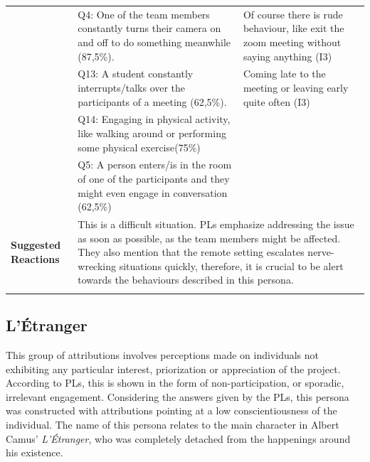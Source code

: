 \begin{longtable}[ht]{ p{}  p{} p{} }
     &  Q4: One of the team members constantly turns their camera on and off to do something meanwhile (87,5\%). & Of course there is rude behaviour, like exit the zoom meeting without saying anything (I3) \\
     & Q13: A student constantly interrupts/talks over the participants of a meeting (62,5\%). &  Coming late to the meeting or leaving early quite often (I3) \\
 	 & Q14: Engaging in physical activity, like walking around or performing some physical exercise(75\%)  \\
 	 & Q5: A person enters/is in the room of one of the participants and they might even engage in conversation (62,5\%) \\
 	\hline
 	 \textbf{Suggested Reactions} & \multicolumn{2}{p{.80\textwidth}}{This is a difficult situation. PLs emphasize addressing the issue as soon as possible, as the team members might be affected. They also mention that the remote setting escalates nerve-wrecking situations quickly, therefore, it is crucial to be alert towards the behaviours described in this persona.} \\
    \hline
\label{tab:multicol}
\end{longtable}

\subsection{L'Étranger}

This group of attributions involves perceptions made on individuals not exhibiting any particular interest, priorization or appreciation of the project. According to PLs, this is shown in the form of non-participation, or sporadic, irrelevant engagement. Considering the answers given by the PLs, this persona was constructed with attributions pointing at a low conscientiousness of the individual. The name of this persona relates to the main character in Albert Camus' \textit{L'Étranger}, who was completely detached from the happenings around his existence. 

